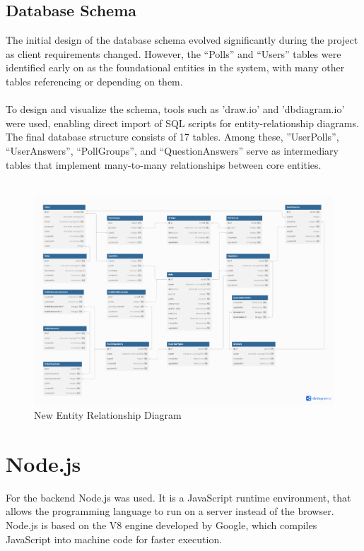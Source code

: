 \documentclass[a4paper,12pt]{report}
\begin{document}
\subsection{Database Schema}
The initial design of the database schema evolved significantly during the project as client requirements changed. However, the “Polls” and “Users” tables were identified early on as the foundational entities in the system, with many other tables referencing or depending on them.\\\\
To design and visualize the schema, tools such as 'draw.io' and 'dbdiagram.io' were used, enabling direct import of SQL scripts for entity-relationship diagrams. The final database structure consists of 17 tables. Among these, ”UserPolls”, “UserAnswers”, “PollGroups”, and “QuestionAnswers” serve as intermediary tables that implement many-to-many relationships between core entities. \\ \\
\begin{figure}[!htb]  
    \centering
    \includegraphics[width=1.1\textwidth]{pics/ERD_NEW.png}
    \caption{New Entity Relationship Diagram}
    \label{fig:new_ERD}
\end{figure}
\newpage

\section{Node.js}
For the backend Node.js was used. It is a JavaScript runtime environment, that allows the programming language to run on a server instead of the browser. Node.js is based on the V8 engine developed by Google, which compiles JavaScript into machine code for faster execution. \parencite{nodejs-intro} \\
\end{document}
